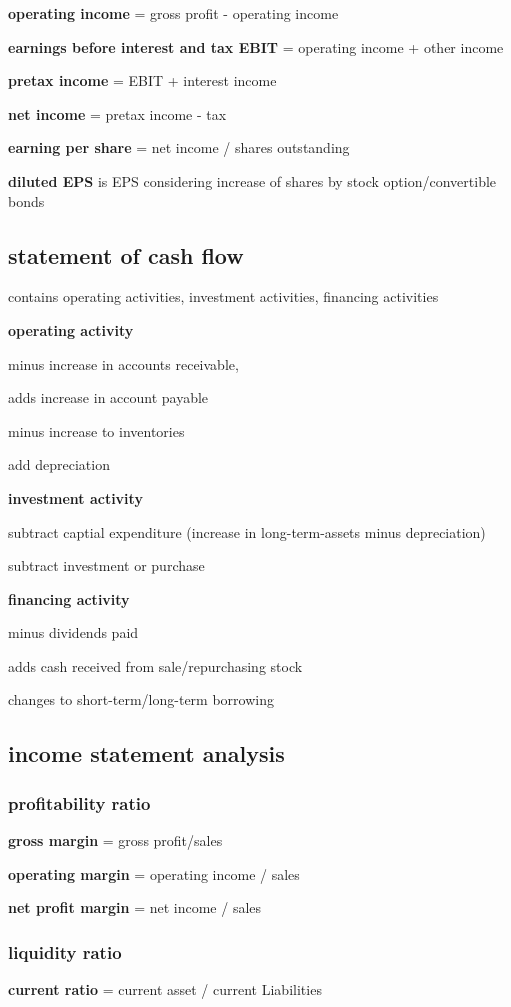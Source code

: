 \documentclass[10pt]{article}
\theoremstyle{break}
\begin{document}
\textbf{operating income} = gross profit - operating income 

\textbf{earnings before interest and tax EBIT} = operating income + other income 

\textbf{pretax income} = EBIT + interest income

\textbf{net income} = pretax income - tax

\textbf{earning per share} = net income / shares outstanding 

\textbf{diluted EPS} is EPS considering increase of shares by stock option/convertible bonds 

\subsection{statement of cash flow}
contains operating activities, investment activities, financing activities

\textbf{operating activity}

minus increase in accounts receivable,

adds increase in account payable 

minus increase to inventories

add depreciation 

\textbf{investment activity}

subtract captial expenditure (increase in long-term-assets minus depreciation)

subtract investment or purchase

\textbf{financing activity}

minus dividends paid 

adds cash received from sale/repurchasing stock 

changes to short-term/long-term borrowing 

\subsection{income statement analysis}
\subsubsection{profitability ratio}

\textbf{gross margin} = gross profit/sales 

\textbf{operating margin} = operating income / sales 

\textbf{net profit margin} = net income / sales 

\subsubsection{liquidity ratio}
\textbf{current ratio} = current asset / current Liabilities 
\end{document}
